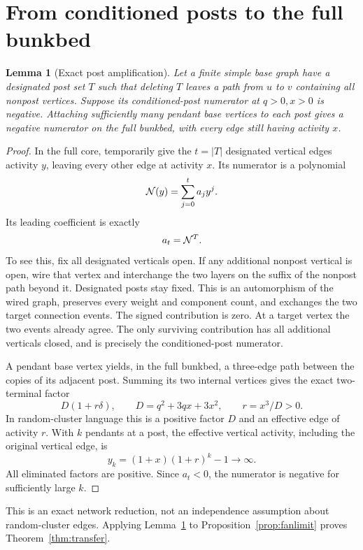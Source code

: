 \documentclass[11pt,a4paper]{article}
\newtheorem{lemma}[theorem]{Lemma}
\theoremstyle{remark}\newtheorem{remark}[theorem]{Remark}
\begin{document}
\section{From conditioned posts to the full bunkbed}\label{sec:posts}
\begin{lemma}[Exact post amplification]\label{lem:amplify}
Let a finite simple base graph have a designated post set $T$ such that deleting $T$ leaves a path from $u$ to $v$ containing all nonpost vertices. Suppose its conditioned-post numerator at $q>0,x>0$ is negative. Attaching sufficiently many pendant base vertices to each post gives a negative numerator on the full bunkbed, with every edge still having activity $x$.
\end{lemma}
\begin{proof}
In the full core, temporarily give the $t=|T|$ designated vertical edges activity $y$, leaving every other edge at activity $x$. Its numerator is a polynomial
\[
\mathcal N(y)=\sum_{j=0}^t a_jy^j.
\]
Its leading coefficient is exactly
\begin{equation}\label{eq:leading}
a_t=\mathcal N^T.
\end{equation}
To see this, fix all designated verticals open. If any additional nonpost vertical is open, wire that vertex and interchange the two layers on the suffix of the nonpost path beyond it. Designated posts stay fixed. This is an automorphism of the wired graph, preserves every weight and component count, and exchanges the two target connection events. The signed contribution is zero. At a target vertex the two events already agree. The only surviving contribution has all additional verticals closed, and is precisely the conditioned-post numerator.

A pendant base vertex yields, in the full bunkbed, a three-edge path between the copies of its adjacent post. Summing its two internal vertices gives the exact two-terminal factor
\[
D(1+r\delta),\qquad D=q^2+3qx+3x^2,\qquad r=x^3/D>0.
\]
In random-cluster language this is a positive factor $D$ and an effective edge of activity $r$. With $k$ pendants at a post, the effective vertical activity, including the original vertical edge, is
\begin{equation}\label{eq:yk}
y_k=(1+x)(1+r)^k-1\longrightarrow\infty.
\end{equation}
All eliminated factors are positive. Since $a_t<0$, the numerator is negative for sufficiently large $k$.
\end{proof}
This is an exact network reduction, not an independence assumption about random-cluster edges. Applying Lemma~\ref{lem:amplify} to Proposition~\ref{prop:fanlimit} proves Theorem~\ref{thm:transfer}.
\end{document}
